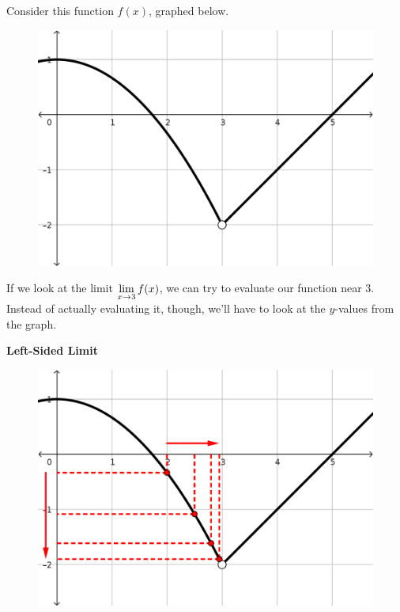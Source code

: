 Consider this function $f(x)$, graphed below.

\begin{figure}[h!tb]
  \includegraphics[scale=0.75]{./1_limits/images/1-1_graph1.png}
  \centering
\end{figure}

If we look at the limit $\displaystyle \lim_{x\to 3} f(x)$, we can try to evaluate our function near $3$.
Instead of actually evaluating it, though, we'll have to look at the $y$-values from the graph.

\textbf{Left-Sided Limit}

\begin{figure}[h!tb]
  \includegraphics[scale=0.75]{./1_limits/images/1-1_graph1L.png}
  \centering
\end{figure}

